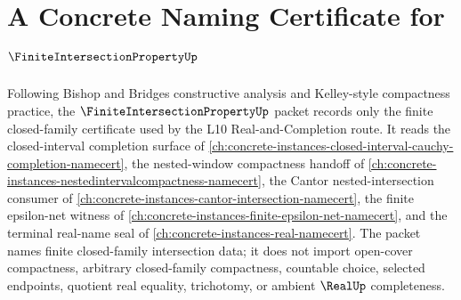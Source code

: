 \chapter{A Concrete Naming Certificate for $\FiniteIntersectionPropertyUp$}
\label{ch:concrete-instances-finite-intersection-property-namecert}

Following Bishop and Bridges constructive analysis and Kelley-style compactness practice, the $\FiniteIntersectionPropertyUp$ packet records only the finite closed-family certificate used by the L10 Real-and-Completion route. It reads the closed-interval completion surface of \autoref{ch:concrete-instances-closed-interval-cauchy-completion-namecert}, the nested-window compactness handoff of \autoref{ch:concrete-instances-nestedintervalcompactness-namecert}, the Cantor nested-intersection consumer of \autoref{ch:concrete-instances-cantor-intersection-namecert}, the finite epsilon-net witness of \autoref{ch:concrete-instances-finite-epsilon-net-namecert}, and the terminal real-name seal of \autoref{ch:concrete-instances-real-namecert}. The packet names finite closed-family intersection data; it does not import open-cover compactness, arbitrary closed-family compactness, countable choice, selected endpoints, quotient real equality, trichotomy, or ambient $\RealUp$ completeness.

